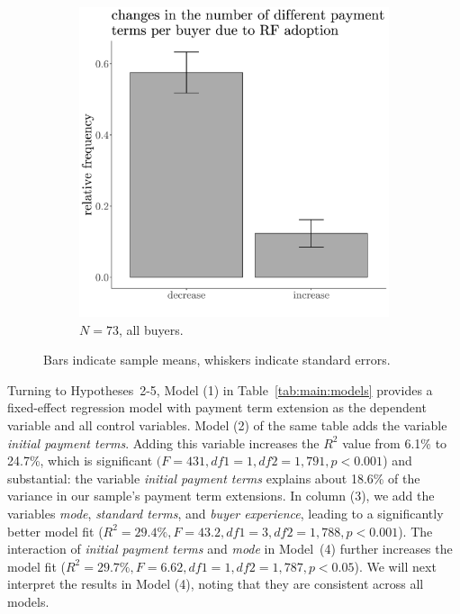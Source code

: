 \documentclass[a4paper,11pt]{article}
\renewcommand{\~}[1]{\tilde{#1}}
\renewcommand{\-}[1]{\overline{#1}}
\begin{document}
\begin{figure}[htb]
\begin{subfigure}[b]{0.47\textwidth}
        \includegraphics[width=\textwidth]{figures/bar.chart.programs.pdf}
        \caption{$N=73$, all buyers. \vspace{24pt}}
         \label{fig:bar.harmonize}
     \end{subfigure}     
    \caption{Bars indicate sample means, whiskers indicate standard errors. }
    \label{fig:bars}
\end{figure}


Turning to Hypotheses~2-5,  Model (1) in Table~\ref{tab:main:models} provides a fixed-effect regression model with payment term extension as the dependent variable and all control variables. Model (2) of the same table adds the variable \textit{initial payment terms}. Adding this variable increases the $R^2$ value from 6.1\% to 24.7\%, which is significant $(F=431, df1=1, df2=1,791, p<0.001$) and substantial: the variable \textit{initial payment terms} explains about 18.6\% of the variance in our sample's payment term extensions. In column (3), we add the variables \textit{mode}, \textit{standard terms}, and \textit{buyer experience}, leading to a significantly better model fit ($R^2=29.4\%, F=43.2, df1=3, df2=1,788, p<0.001$). The interaction of \textit{initial payment terms} and \textit{mode} in Model~(4) further increases the model fit ($R^2=29.7\%, F=6.62, df1=1, df2=1,787, p<0.05$). We will next interpret the results in Model (4), noting that they are consistent across all models. 
\end{document}
